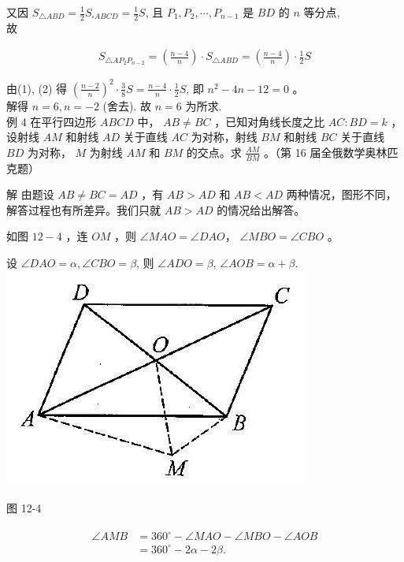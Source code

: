 \documentclass[10pt]{article}
\begin{document}
又因 $S_{\triangle A B D}=\frac{1}{2} S_{\square A B C D}=\frac{1}{2} S$, 且 $P_{1}, P_{2}, \cdots, P_{n-1}$ 是 $B D$ 的 $n$ 等分点,\\
故

\begin{align*}
S_{\triangle A P_{2} P_{n-2}}=\left(\frac{n-4}{n}\right) \cdot S_{\triangle A B D}=\left(\frac{n-4}{n}\right) \cdot \frac{1}{2} S \tag{2}
\end{align*}

由(1), (2) 得 $\left(\frac{n-2}{n}\right)^{2} \cdot \frac{3}{8} S=\frac{n-4}{n} \cdot \frac{1}{2} S$, 即 $n^{2}-4 n-12=0$ 。\\
解得 $n=6, n=-2$ (舍去). 故 $n=6$ 为所求.\\
例 4 在平行四边形 $A B C D$ 中， $A B \neq B C$ ，已知对角线长度之比 $A C: B D=k$ ，设射线 $A M$ 和射线 $A D$ 关于直线 $A C$ 为对称，射线 $B M$ 和射线 $B C$ 关于直线 $B D$ 为对称， $M$ 为射线 $A M$ 和 $B M$ 的交点。求 $\frac{A M}{B M}$ 。（第 16 届全俄数学奥林匹克题）

解 由题设 $A B \neq B C=A D$ ，有 $A B>A D$ 和 $A B<A D$ 两种情况，图形不同，解答过程也有所差异。我们只就 $A B>A D$ 的情况给出解答。

如图 $12-4$ ，连 $O M$ ，则 $\angle M A O=\angle D A O ，$ $\angle M B O=\angle C B O$ 。

设 $\angle D A O=\alpha, \angle C B O=\beta$, 则 $\angle A D O=\beta$, $\angle A O B=\alpha+\beta$.\\
\includegraphics[max width=\textwidth, center]{2024_10_30_2c8f45efd4a519b08e1ag-111(1)}

图 12-4

\begin{align*}
\begin{aligned}
\angle A M B & =360^{\circ}-\angle M A O-\angle M B O-\angle A O B \\
& =360^{\circ}-2 \alpha-2 \beta .
\end{aligned}
\end{align*}
\end{document}
